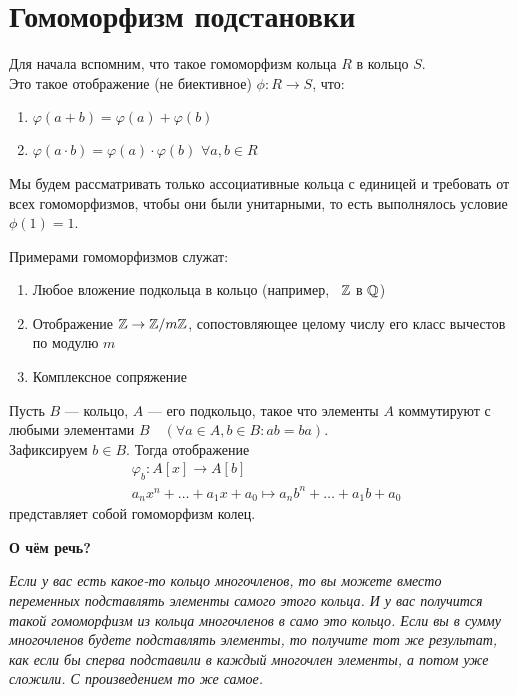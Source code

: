
\section{Гомоморфизм подстановки}
\begin{normalsize}
    Для начала вспомним, что такое гомоморфизм кольца $R$ в кольцо $S$. \\
    Это такое отображение (не биективное) $\phi: R \rightarrow S$, что:
    \begin{enumerate}
        \item $\varphi(a + b) = \varphi(a) + \varphi(b)$
        \item $\varphi(a\cdot b) = \varphi(a) \cdot \varphi(b)$
        $\forall a,b \in R$
    \end{enumerate}
    Мы будем рассматривать только ассоциативные кольца с единицей и требовать
    от всех гомоморфизмов, чтобы они были унитарными, то есть выполнялось
    условие $\phi(1) = 1$.
    
    Примерами гомоморфизмов служат:
    \begin{enumerate}
        \item Любое вложение подкольца в кольцо (например,  $\mathbb{Z}$ в $\mathbb{Q}$)
        \item Отображение $\mathbb{Z} \rightarrow \mathbb{Z} /m\mathbb{Z}$, сопостовляющее целому числу
        его класс вычестов по модулю $m$
        \item Комплексное сопряжение
    \end{enumerate}

    \begin{theorem-non}
        Пусть $B$ --- кольцо, $A$ --- его подкольцо, такое что элементы
        $A$ коммутируют с любыми элементами $B\quad (\forall a \in A, b \in B: ab = ba)$. \\
        Зафиксируем $b \in B$. Тогда отображение
        \begin{align*}
            &\varphi_b: A[x] \rightarrow A[b]\\
            &a_nx^n + \dots + a_1x + a_0 \mapsto a_nb^n + \dots + a_1b + a_0
        \end{align*}
        представляет собой гомоморфизм колец.
    \end{theorem-non}

    \textbf{О чём речь?}

    \emph{Если у вас есть какое-то кольцо многочленов, то вы можете вместо переменных
    подставлять элементы самого этого кольца. И у вас получится такой гомоморфизм из
    кольца многочленов в само это кольцо. Если вы в сумму многочленов будете подставлять элементы,
    то получите тот же результат, как если бы сперва подставили в каждый многочлен элементы,
    а потом уже сложили. С произведением то же самое.} \\
    

\end{normalsize}
